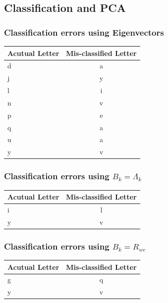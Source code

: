 \documentclass{article}
\begin{document}
	\subsection{Classification and PCA}
		\subsubsection{Classification errors using Eigenvectors}
			\begin{center}
				\begin{tabular}{| l | c |}
					\hline
					Acutual Letter & Mis-classified Letter \\ \hline
					d & a \\ \hline
					j & y \\ \hline
					l & i \\ \hline
					n & v \\ \hline
					p & e \\ \hline
					q & a \\ \hline
					u & a \\ \hline
					y & v \\ \hline
				\end{tabular}
			\end{center}
		\subsubsection{Classification errors using $B_{k}=\Lambda_{k}$}
			\begin{center}
				\begin{tabular}{| l | c |}
					\hline
					Acutual Letter & Mis-classified Letter \\ \hline
					i & l \\ \hline
					y & v \\ \hline
				\end{tabular}
			\end{center}
		\subsubsection{Classification errors using $B_{k}=R_{wc}$}
			\begin{center}
				\begin{tabular}{| l | c |}
					\hline
					Acutual Letter & Mis-classified Letter \\ \hline
					g & q \\ \hline
					y & v \\ \hline
				\end{tabular}
			\end{center}
\end{document}

